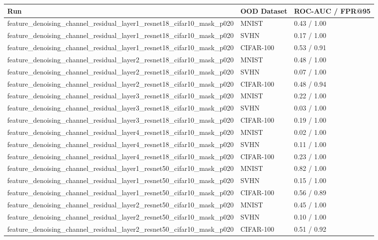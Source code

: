 \begin{tabular}{lll}
\toprule
Run & OOD Dataset & ROC-AUC / FPR@95 \\
\midrule
feature\_denoising\_channel\_residual\_layer1\_resnet18\_cifar10\_mask\_p020 & MNIST & 0.43 / 1.00 \\
feature\_denoising\_channel\_residual\_layer1\_resnet18\_cifar10\_mask\_p020 & SVHN & 0.17 / 1.00 \\
feature\_denoising\_channel\_residual\_layer1\_resnet18\_cifar10\_mask\_p020 & CIFAR-100 & 0.53 / 0.91 \\
feature\_denoising\_channel\_residual\_layer2\_resnet18\_cifar10\_mask\_p020 & MNIST & 0.48 / 1.00 \\
feature\_denoising\_channel\_residual\_layer2\_resnet18\_cifar10\_mask\_p020 & SVHN & 0.07 / 1.00 \\
feature\_denoising\_channel\_residual\_layer2\_resnet18\_cifar10\_mask\_p020 & CIFAR-100 & 0.48 / 0.94 \\
feature\_denoising\_channel\_residual\_layer3\_resnet18\_cifar10\_mask\_p020 & MNIST & 0.22 / 1.00 \\
feature\_denoising\_channel\_residual\_layer3\_resnet18\_cifar10\_mask\_p020 & SVHN & 0.03 / 1.00 \\
feature\_denoising\_channel\_residual\_layer3\_resnet18\_cifar10\_mask\_p020 & CIFAR-100 & 0.19 / 1.00 \\
feature\_denoising\_channel\_residual\_layer4\_resnet18\_cifar10\_mask\_p020 & MNIST & 0.02 / 1.00 \\
feature\_denoising\_channel\_residual\_layer4\_resnet18\_cifar10\_mask\_p020 & SVHN & 0.11 / 1.00 \\
feature\_denoising\_channel\_residual\_layer4\_resnet18\_cifar10\_mask\_p020 & CIFAR-100 & 0.23 / 1.00 \\
feature\_denoising\_channel\_residual\_layer1\_resnet50\_cifar10\_mask\_p020 & MNIST & 0.82 / 1.00 \\
feature\_denoising\_channel\_residual\_layer1\_resnet50\_cifar10\_mask\_p020 & SVHN & 0.15 / 1.00 \\
feature\_denoising\_channel\_residual\_layer1\_resnet50\_cifar10\_mask\_p020 & CIFAR-100 & 0.56 / 0.89 \\
feature\_denoising\_channel\_residual\_layer2\_resnet50\_cifar10\_mask\_p020 & MNIST & 0.45 / 1.00 \\
feature\_denoising\_channel\_residual\_layer2\_resnet50\_cifar10\_mask\_p020 & SVHN & 0.10 / 1.00 \\
feature\_denoising\_channel\_residual\_layer2\_resnet50\_cifar10\_mask\_p020 & CIFAR-100 & 0.51 / 0.92 \\

\end{tabular}

